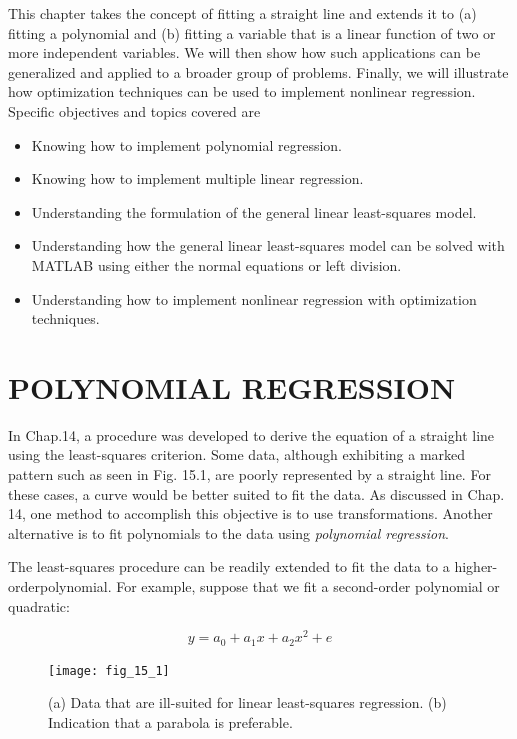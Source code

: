 \documentclass[../main.tex]{subfiles}
\begin{document}
\noindent This chapter takes the concept of fitting a straight line and extends it to (a) fitting a polynomial and (b) fitting a variable that is a linear function of two or more independent variables. We will then show how such applications can be generalized and applied to a broader group of problems. Finally, we will illustrate how optimization techniques can be used to implement nonlinear regression. Specific objectives and topics covered are

\begin{itemize}
	\item Knowing how to implement polynomial regression.
	\item Knowing how to implement multiple linear regression. 
	\item Understanding the formulation of the general linear least-squares model.
	\item Understanding how the general linear least-squares model can be solved with MATLAB using either the normal equations or left division.
	\item Understanding how to implement nonlinear regression with optimization techniques.
\end{itemize}


\label{cha:cha_P_15_1}
\section{POLYNOMIAL REGRESSION}
\noindent In Chap.14, a procedure was developed to derive the equation of a straight line using the least-squares criterion. Some data, although exhibiting a marked pattern such as seen in Fig. 15.1, are poorly represented by a straight line. For these cases, a curve would be better suited to fit the data. As discussed in Chap. 14, one method to accomplish this objective is to use transformations. Another alternative is to fit polynomials to the data using \emph{polynomial regression}.

The least-squares procedure can be readily extended to fit the data to a higher-orderpolynomial. For example,  suppose that we fit a second-order polynomial or quadratic:

\begin{equation}
	\tag{15.1}
	y = a_0 + a_1x + a_2x^2 + e
\end{equation}

\begin{figure}
    \centering
    \texttt{[image: fig\_15\_1]}
   \caption{\textsf{(a) Data that are ill-suited for linear least-squares regression. (b) Indication that a parabola is preferable.}}
   \label{fig:fig_15_1}
\end{figure}
\end{document}
